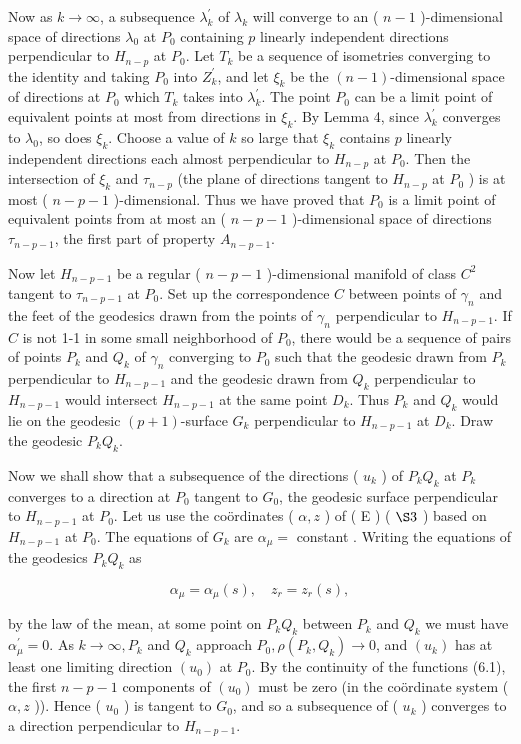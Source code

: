 \documentclass[10pt]{article}
\begin{document}
Now as $k \rightarrow \infty$, a subsequence $\lambda_{k}^{\prime}$ of $\lambda_{k}$ will converge to an ( $n-1$ )-dimensional space of directions $\lambda_{0}$ at $P_{0}$ containing $p$ linearly independent directions perpendicular to $H_{n-p}$ at $P_{0}$. Let $T_{k}$ be a sequence of isometries converging to the identity and taking $P_{0}$ into $Z_{k}^{\prime}$, and let $\xi_{k}$ be the $(n-1)$-dimensional space of directions at $P_{0}$ which $T_{k}$ takes into $\lambda_{k}^{\prime}$. The point $P_{0}$ can be a limit point of equivalent points at most from directions in $\xi_{k}$. By Lemma 4, since $\lambda_{k}^{\prime}$ converges to $\lambda_{0}$, so does $\xi_{k}$. Choose a value of $k$ so large that $\xi_{k}$ contains $p$ linearly independent directions each almost perpendicular to $H_{n-p}$ at $P_{0}$. Then the intersection of $\xi_{k}$ and $\tau_{n-p}$ (the plane of directions tangent to $H_{n-p}$ at $P_{0}$ ) is at most ( $n-p-1$ )-dimensional. Thus we have proved that $P_{0}$ is a limit point of equivalent points from at most an ( $n-p-1$ )-dimensional space of directions $\tau_{n-p-1}$, the first part of property $A_{n-p-1}$.

Now let $H_{n-p-1}$ be a regular ( $n-p-1$ )-dimensional manifold of class $C^{2}$ tangent to $\tau_{n-p-1}$ at $P_{0}$. Set up the correspondence $C$ between points of $\gamma_{n}$ and the feet of the geodesics drawn from the points of $\gamma_{n}$ perpendicular to $H_{n-p-1}$. If $C$ is not 1-1 in some small neighborhood of $P_{0}$, there would be a sequence of pairs of points $P_{k}$ and $Q_{k}$ of $\gamma_{n}$ converging to $P_{0}$ such that the geodesic drawn from $P_{k}$ perpendicular to $H_{n-p-1}$ and the geodesic drawn from $Q_{k}$ perpendicular to $H_{n-p-1}$ would intersect $H_{n-p-1}$ at the same point $D_{k}$. Thus $P_{k}$ and $Q_{k}$ would lie on the geodesic $(p+1)$-surface $G_{k}$ perpendicular to $H_{n-p-1}$ at $D_{k}$. Draw the geodesic $P_{k} Q_{k}$.

Now we shall show that a subsequence of the directions ( $u_{k}$ ) of $P_{k} Q_{k}$ at $P_{k}$ converges to a direction at $P_{0}$ tangent to $G_{0}$, the geodesic surface perpendicular to $H_{n-p-1}$ at $P_{0}$. Let us use the coördinates ( $\alpha, z$ ) of ( E ) ( $\S 3$ ) based on $H_{n-p-1}$ at $P_{0}$. The equations of $G_{k}$ are $\alpha_{\mu}=$ constant . Writing the equations of the geodesics $P_{k} Q_{k}$ as

$$
\alpha_{\mu}=\alpha_{\mu}(s), \quad z_{r}=z_{r}(s),
$$

by the law of the mean, at some point on $P_{k} Q_{k}$ between $P_{k}$ and $Q_{k}$ we must have $\alpha_{\mu}^{\prime}=0$. As $k \rightarrow \infty, P_{k}$ and $Q_{k}$ approach $P_{0}, \rho\left(P_{k}, Q_{k}\right) \rightarrow 0$, and $\left(u_{k}\right)$ has at least one limiting direction $\left(u_{0}\right)$ at $P_{0}$. By the continuity of the functions (6.1), the first $n-p-1$ components of $\left(u_{0}\right)$ must be zero (in the coördinate system ( $\alpha, z$ )). Hence ( $u_{0}$ ) is tangent to $G_{0}$, and so a subsequence of ( $u_{k}$ ) converges to a direction perpendicular to $H_{n-p-1}$.
\end{document}
